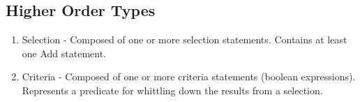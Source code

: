 \subsection{Higher Order Types}
\begin{enumerate}
\item Selection - Composed of one or more selection statements. Contains at least one Add statement.
\item Criteria - Composed of one or more criteria statements (boolean expressions). Represents a predicate for whittling down the results from a selection. 
\end{enumerate}